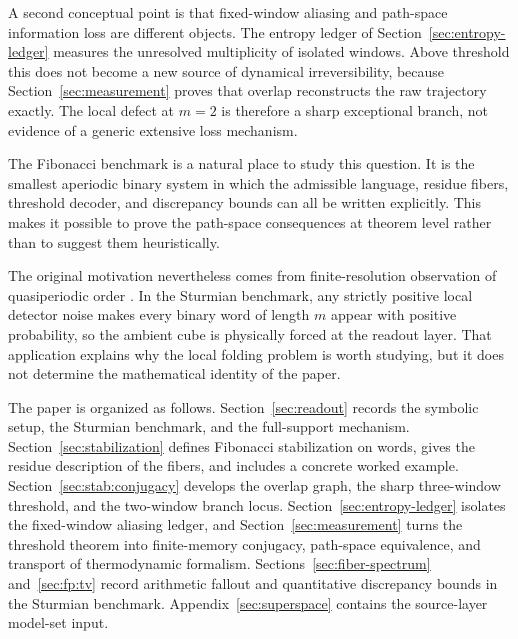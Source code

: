 A second conceptual point is that fixed-window aliasing and path-space information loss are different objects. The entropy ledger of Section~\ref{sec:entropy-ledger} measures the unresolved multiplicity of isolated windows. Above threshold this does not become a new source of dynamical irreversibility, because Section~\ref{sec:measurement} proves that overlap reconstructs the raw trajectory exactly. The local defect at $m=2$ is therefore a sharp exceptional branch, not evidence of a generic extensive loss mechanism.

The Fibonacci benchmark is a natural place to study this question. It is the smallest aperiodic binary system in which the admissible language, residue fibers, threshold decoder, and discrepancy bounds can all be written explicitly. This makes it possible to prove the path-space consequences at theorem level rather than to suggest them heuristically.

The original motivation nevertheless comes from finite-resolution observation of quasiperiodic order \cite{Shechtman1984,Jagannathan2021,BaakeGrimm2013}. In the Sturmian benchmark, any strictly positive local detector noise makes every binary word of length $m$ appear with positive probability, so the ambient cube is physically forced at the readout layer. That application explains why the local folding problem is worth studying, but it does not determine the mathematical identity of the paper.

The paper is organized as follows. Section~\ref{sec:readout} records the symbolic setup, the Sturmian benchmark, and the full-support mechanism. Section~\ref{sec:stabilization} defines Fibonacci stabilization on words, gives the residue description of the fibers, and includes a concrete worked example. Section~\ref{sec:stab:conjugacy} develops the overlap graph, the sharp three-window threshold, and the two-window branch locus. Section~\ref{sec:entropy-ledger} isolates the fixed-window aliasing ledger, and Section~\ref{sec:measurement} turns the threshold theorem into finite-memory conjugacy, path-space equivalence, and transport of thermodynamic formalism. Sections~\ref{sec:fiber-spectrum} and~\ref{sec:fp:tv} record arithmetic fallout and quantitative discrepancy bounds in the Sturmian benchmark. Appendix~\ref{sec:superspace} contains the source-layer model-set input.
